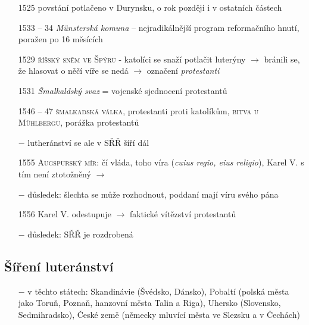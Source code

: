 \documentclass{article}
\begin{document}
\begin{itemize}
    \item[1525] povstání potlačeno v Durynsku, o rok později i v ostatních částech
    \item[1533 -- 34] \textit{Münsterská komuna} -- nejradikálnější program reformačního hnutí, poražen po 16 měsících
    \item[1529] \textsc{říšský sněm ve Špýru} - katolíci se snaží potlačit luterýny $\rightarrow$ bránili se, že hlasovat o něčí víře se nedá $\rightarrow$ označení \textit{protestanti}
    \item[1531] \textit{Šmalkaldský svaz} = vojenské sjednocení protestantů
    \item[1546 -- 47] \textsc{šmalkadská válka}, protestanti proti katolíkům, \textsc{bitva u Mühlbergu}, porážka protestantů
    \item[$-$] lutheránství se ale v SŘŘ šíří dál
    \item[1555] \textsc{Augspurský mír}: čí vláda, toho víra (\textit{cuius regio, eius religio}), Karel V. s tím není ztotožněný $\rightarrow$
    \item[$-$] důsledek: šlechta se může rozhodnout, poddaní mají víru svého pána
    \item[1556] Karel V. odestupuje $\rightarrow$ faktické vítězství protestantů
    \item[$-$] důsledek: SŘŘ je rozdrobená

\end{itemize}

\subsection*{Šíření luteránství}
\begin{itemize}
    \vspace{-0.5em}
    \setlength\itemsep{0.15em}
    \item[$-$] v těchto státech: Skandinávie (Švédsko, Dánsko), Pobaltí (polská města jako Toruň, Poznaň, hanzovní města Talin a Riga), Uhersko (Slovensko, Sedmihradsko), České země (německy mluvící města ve Slezsku a v Čechách)
\end{itemize}
\end{document}
